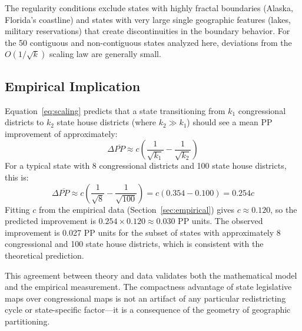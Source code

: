 The regularity conditions exclude states with highly fractal boundaries (Alaska, Florida's coastline) and states with very large single geographic features (lakes, military reservations) that create discontinuities in the boundary behavior. For the 50 contiguous and non-contiguous states analyzed here, deviations from the $O(1/\sqrt{k})$ scaling law are generally small.

\subsection{Empirical Implication}

Equation~\eqref{eq:scaling} predicts that a state transitioning from $k_1$ congressional districts to $k_2$ state house districts (where $k_2 \gg k_1$) should see a mean PP improvement of approximately:
\begin{equation}
  \Delta\overline{PP} \approx c \left(\frac{1}{\sqrt{k_1}} - \frac{1}{\sqrt{k_2}}\right)
  \label{eq:delta}
\end{equation}
For a typical state with 8 congressional districts and 100 state house districts, this is:
\begin{equation}
  \Delta\overline{PP} \approx c \left(\frac{1}{\sqrt{8}} - \frac{1}{\sqrt{100}}\right) = c \left(0.354 - 0.100\right) = 0.254c
  \label{eq:typical}
\end{equation}
Fitting $c$ from the empirical data (Section~\ref{sec:empirical}) gives $c \approx 0.120$, so the predicted improvement is $0.254 \times 0.120 \approx 0.030$ PP units. The observed improvement is 0.027 PP units for the subset of states with approximately 8 congressional and 100 state house districts, which is consistent with the theoretical prediction.

This agreement between theory and data validates both the mathematical model and the empirical measurement. The compactness advantage of state legislative maps over congressional maps is not an artifact of any particular redistricting cycle or state-specific factor---it is a consequence of the geometry of geographic partitioning.
